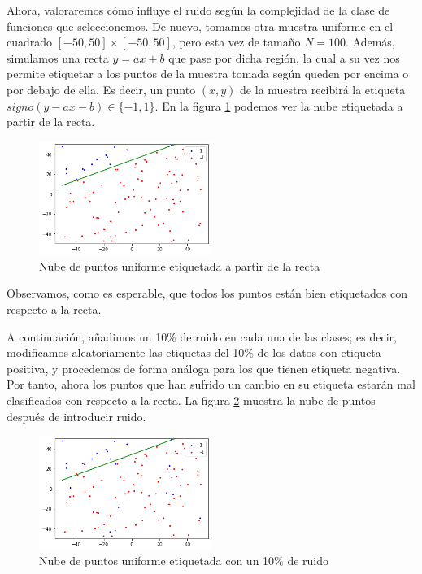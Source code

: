\documentclass[10pt,a4paper]{article}
\begin{document}
Ahora, valoraremos cómo influye el ruido según la complejidad de la clase de funciones que seleccionemos. De nuevo, tomamos otra muestra uniforme en el cuadrado $[-50,50] \times [-50,50]$, pero esta vez de tamaño $N=100$. Además, simulamos una recta $y=ax+b$ que pase por dicha región, la cual a su vez nos permite etiquetar a los puntos de la muestra tomada según queden por encima o por debajo de ella. Es decir, un punto $(x,y)$ de la muestra recibirá la etiqueta $signo(y-ax-b) \in \{-1,1\}$. En la figura \ref{fig:ej1.2_nube_etiq} podemos ver la nube etiquetada a partir de la recta.

\begin{figure}[h]
	\centering
	\includegraphics[width=0.5\textwidth]{ej1.2_nube_etiq}
	\caption{Nube de puntos uniforme etiquetada a partir de la recta}
	\label{fig:ej1.2_nube_etiq}
\end{figure}

Observamos, como es esperable, que todos los puntos están bien etiquetados con respecto a la recta.

A continuación, añadimos un 10\% de ruido en cada una de las clases; es decir, modificamos aleatoriamente las etiquetas del 10\% de los datos con etiqueta positiva, y procedemos de forma análoga para los que tienen etiqueta negativa. Por tanto, ahora los puntos que han sufrido un cambio en su etiqueta estarán mal clasificados con respecto a la recta. La figura \ref{fig:ej1.2_nube_ruido} muestra la nube de puntos después de introducir ruido.

\begin{figure}[h]
	\centering
	\includegraphics[width=0.5\textwidth]{ej1.2_nube_ruido}
	\caption{Nube de puntos uniforme etiquetada con un 10\% de ruido}
	\label{fig:ej1.2_nube_ruido}
\end{figure}
\end{document}
